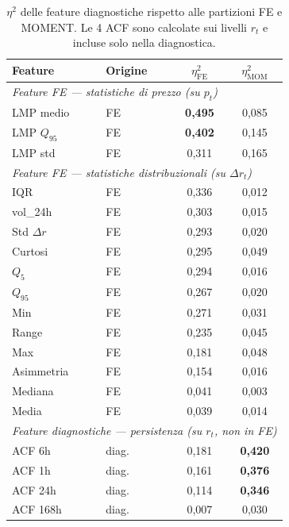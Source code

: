 \documentclass[12pt]{article}
\begin{document}
\begin{table}[H]
\centering
\caption{$\eta^2$ delle feature diagnostiche rispetto alle partizioni FE e MOMENT. Le 4 ACF sono calcolate sui livelli $r_t$ e incluse solo nella diagnostica.}
\label{tab:cross_projection}
\small
\setlength{\tabcolsep}{4pt}
\begin{tabular}{llcc}
\toprule
Feature & Origine & $\eta^2_\text{FE}$ & $\eta^2_\text{MOM}$ \\
\midrule
\multicolumn{4}{l}{\textit{Feature FE --- statistiche di prezzo (su $p_t$)}} \\
LMP medio        & FE & \textbf{0,495} & 0,085 \\
LMP $Q_{95}$     & FE & \textbf{0,402} & 0,145 \\
LMP std          & FE & 0,311 & 0,165 \\
\midrule
\multicolumn{4}{l}{\textit{Feature FE --- statistiche distribuzionali (su $\Delta r_t$)}} \\
IQR              & FE & 0,336 & 0,012 \\
vol\_24h         & FE & 0,303 & 0,015 \\
Std $\Delta r$   & FE & 0,293 & 0,020 \\
Curtosi          & FE & 0,295 & 0,049 \\
$Q_5$            & FE & 0,294 & 0,016 \\
$Q_{95}$         & FE & 0,267 & 0,020 \\
Min              & FE & 0,271 & 0,031 \\
Range            & FE & 0,235 & 0,045 \\
Max              & FE & 0,181 & 0,048 \\
Asimmetria       & FE & 0,154 & 0,016 \\
Mediana          & FE & 0,041 & 0,003 \\
Media            & FE & 0,039 & 0,014 \\
\midrule
\multicolumn{4}{l}{\textit{Feature diagnostiche --- persistenza (su $r_t$, non in FE)}} \\
ACF 6h           & diag. & 0,181 & \textbf{0,420} \\
ACF 1h           & diag. & 0,161 & \textbf{0,376} \\
ACF 24h          & diag. & 0,114 & \textbf{0,346} \\
ACF 168h         & diag. & 0,007 & 0,030 \\
\bottomrule
\end{tabular}
\end{table}
\end{document}
